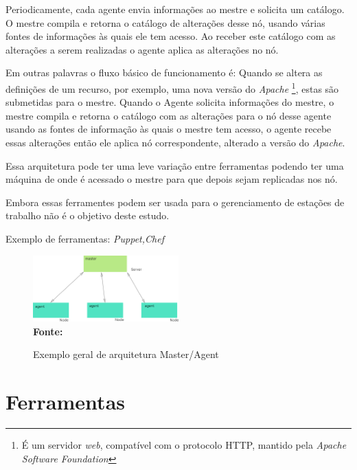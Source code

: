  Periodicamente, cada agente envia informações ao mestre e solicita um catálogo. O mestre compila e retorna o catálogo de alterações desse nó, usando várias fontes de informações às quais ele tem acesso. Ao receber este catálogo com as alterações a serem realizadas o agente aplica as alterações no nó. 
 
 Em outras palavras o fluxo básico de funcionamento é: Quando se altera as definições de um recurso, por exemplo, uma nova versão do \textit{Apache} \footnote{É um servidor \textit{web}, compatível com o protocolo HTTP, mantido pela \textit{Apache Software Foundation }}, estas são submetidas para o mestre. Quando o Agente solicita informações do mestre, o mestre compila e retorna o catálogo com as alterações para o nó desse agente usando as fontes de informação às quais o mestre tem acesso, o agente recebe essas alterações então ele aplica nó correspondente, alterado a versão do \textit{Apache}.   

Essa arquitetura pode ter uma leve variação entre ferramentas podendo ter uma máquina de onde é acessado o mestre para que depois sejam replicadas nos nó.

Embora essas ferramentes podem ser usada para o gerenciamento de estações de trabalho não é o objetivo deste estudo.

Exemplo de ferramentas: \textit{Puppet,Chef} 

 \begin{figure}[ht]
	\centering	
	\caption[\hspace{0.1cm}Exemplo arquitetura Master/Agent]{Exemplo geral de arquitetura Master/Agent}
	\vspace{-0.4cm}
	\includegraphics[width=0.5\textwidth]{figuras/master-agent.png}
	 \vspace{-0.2cm}
	\\\textbf{\footnotesize Fonte: \cite{Harit}}
	\label{fig:figura4}
\end{figure}
\vspace{-0.5cm}

\section{Ferramentas}

